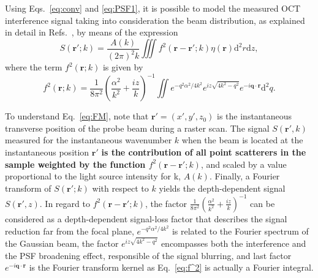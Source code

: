 Using Eqs.~\ref{eq:conv} and \ref{eq:PSF1}, it is possible to model the measured OCT interference signal taking into consideration the beam distribution, as explained in detail in Refs.~\cite{Ralston2006_Inverse, Marks2006_Inverse}, by means of the expression
\begin{equation}\label{eq:FM}
    S(\mathbf{r'}; k) = \frac{A(k)}{(2\pi)^2 k} \iiint f^2(\mathbf{r}-\mathbf{r'}; k) \eta(\mathbf{r}) \text{d}^2r \text{d}z,
\end{equation}
where the term $f^2(\mathbf{r}; k)$ is given by
\begin{equation}\label{eq:f^2}
    f^2(\mathbf{r}; k) = \frac{1}{8\pi^2}\left(\frac{\alpha^2}{k^2}+\frac{iz}{k}\right)^{-1} \iint e^{-q^2\alpha^2/4k^2} e^{iz\sqrt{4k^2-q^2}} e^{-i\mathbf{q}\cdot \mathbf{r}} \text{d}^2q.
\end{equation}

To understand Eq.~\ref{eq:FM}, note that $\mathbf{r'}=(x',y',z_0)$ is the instantaneous transverse position of the probe beam during a raster scan. The signal $S(\mathbf{r'},k)$ measured for the instantaneous wavenumber $k$ when the beam is located at the instantaneous position $\mathbf{r'}$ \textbf{is the contribution of all point scatterers in the sample weighted by the function $f^2(\mathbf{r}-\mathbf{r'}; k)$}, and scaled by a value proportional to the light source intensity for k, $A(k)$. Finally, a Fourier transform of $S(\mathbf{r'}; k)$ with respect to $k$ yields the depth-dependent signal $S(\mathbf{r'}, z)$. In regard to $f^2(\mathbf{r}-\mathbf{r'}; k)$, the factor $\frac{1}{8\pi^2}\left(\frac{\alpha^2}{k^2}+\frac{iz}{k}\right)^{-1}$ can be considered as a depth-dependent signal-loss factor that describes the signal reduction far from the focal plane, $e^{-q^2\alpha^2/4k^2}$ is related to the Fourier spectrum of the Gaussian beam, the factor $e^{iz\sqrt{4k^2-q^2}}$ encompasses both the interference and the PSF broadening effect, responsible of the signal blurring, and last factor $e^{-i\mathbf{q}\cdot \mathbf{r}}$ is the Fourier transform kernel as Eq.~\ref{eq:f^2} is actually a Fourier integral.


